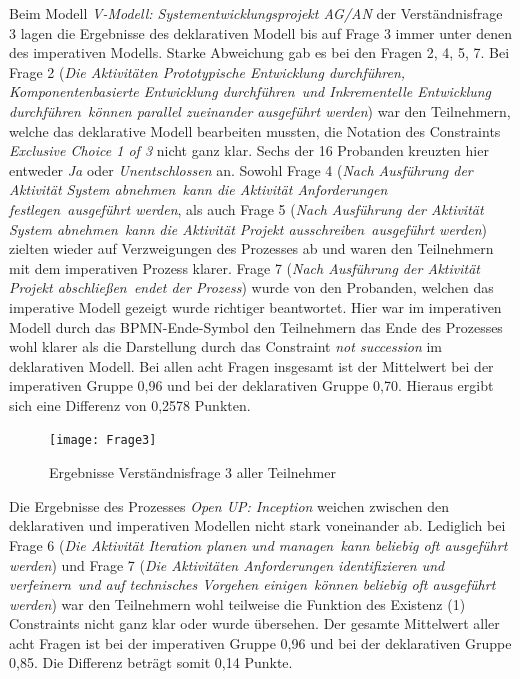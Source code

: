 Beim Modell \textit{V-Modell: Systementwicklungsprojekt AG/AN} der Verständnisfrage 3 lagen die Ergebnisse des deklarativen Modell bis auf Frage 3 immer unter denen des imperativen Modells. Starke Abweichung gab es bei den Fragen 2, 4, 5, 7. \newline
Bei Frage 2 (\textit{Die Aktivitäten \grqq Prototypische Entwicklung durchführen\grqq, \grqq Komponentenbasierte Entwicklung durchführen\grqq \ und \grqq Inkrementelle Entwicklung durchführen\grqq \ können parallel zueinander ausgeführt werden}) war den Teilnehmern, welche das deklarative Modell bearbeiten mussten, die Notation des Constraints \textit {Exclusive Choice 1 of 3} nicht ganz klar. Sechs der 16 Probanden kreuzten hier entweder \textit{Ja} oder \textit{Unentschlossen} an.\newline
Sowohl Frage 4 (\textit{Nach Ausführung der Aktivität \grqq System abnehmen\grqq \ kann die Aktivität \grqq Anforderungen festlegen\grqq \ ausgeführt werden}, als auch Frage 5 (\textit{Nach Ausführung der Aktivität \grqq System abnehmen\grqq \ kann die Aktivität \grqq Projekt ausschreiben\grqq \ ausgeführt werden}) zielten wieder auf Verzweigungen des Prozesses ab und waren den Teilnehmern mit dem imperativen Prozess klarer. \newline
Frage 7 (\textit{Nach Ausführung der Aktivität \grqq Projekt abschließen\grqq \ endet der Prozess}) wurde von den Probanden, welchen das imperative Modell gezeigt wurde richtiger beantwortet. Hier war im imperativen Modell durch das BPMN-Ende-Symbol den Teilnehmern das Ende des Prozesses wohl klarer als die Darstellung durch das Constraint \textit{not succession} im deklarativen Modell.\newline
Bei allen acht Fragen insgesamt ist der Mittelwert bei der imperativen Gruppe 0,96 und bei der deklarativen Gruppe 0,70. Hieraus ergibt sich eine Differenz von 0,2578 Punkten. \newline


\begin{figure}[htp]
\begin{center}
  \texttt{[image: Frage3]} %
  \caption{Ergebnisse Verständnisfrage 3 aller Teilnehmer}
  \label{fig:Frage3}
\end{center}
\end{figure}

Die Ergebnisse des Prozesses \textit{Open UP: Inception} weichen zwischen den deklarativen und imperativen Modellen nicht stark voneinander ab. \newline
Lediglich bei Frage 6 (\textit{Die Aktivität \grqq Iteration planen und managen\grqq \ kann beliebig oft ausgeführt werden}) und Frage 7 (\textit{Die Aktivitäten \grqq Anforderungen identifizieren und verfeinern\grqq \ und \grqq auf technisches Vorgehen einigen\grqq \ können beliebig oft ausgeführt werden}) war den Teilnehmern wohl teilweise die Funktion des Existenz (1) Constraints nicht ganz klar oder wurde übersehen.\newline
Der gesamte Mittelwert aller acht Fragen ist bei der imperativen Gruppe 0,96 und bei der deklarativen Gruppe 0,85. Die Differenz beträgt somit 0,14 Punkte. \newline



